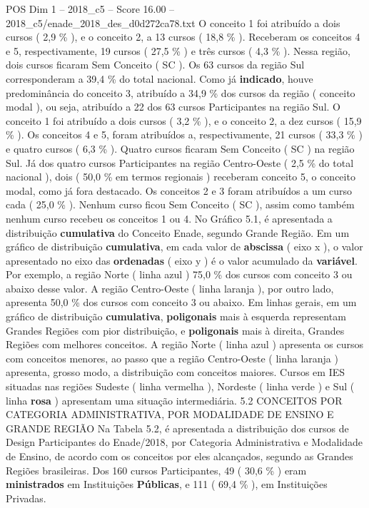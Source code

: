 \begin{textsample}{POS Dim 1 – 2018\_c5 – Score 16.00 – 2018\_c5/enade\_2018\_des\_d0d272ca78.txt}
O conceito 1 foi atribuído a dois cursos ( 2,9 \% ), e o conceito 2, a 13 cursos ( 18,8 \% ).
Receberam os conceitos 4 e 5, respectivamente, 19 cursos ( 27,5 \% ) e três cursos ( 4,3 \% ).
Nessa região, dois cursos ficaram Sem Conceito ( SC ).
Os 63 cursos da região Sul corresponderam a 39,4 \% do total nacional.
Como já \textbf{indicado}, houve predominância do conceito 3, atribuído a 34,9 \% dos cursos da região ( conceito modal ), ou seja, atribuído a 22 dos 63 cursos Participantes na região Sul.
O conceito 1 foi atribuído a dois cursos ( 3,2 \% ), e o conceito 2, a dez cursos ( 15,9 \% ).
Os conceitos 4 e 5, foram atribuídos a, respectivamente, 21 cursos ( 33,3 \% ) e quatro cursos ( 6,3 \% ).
Quatro cursos ficaram Sem Conceito ( SC ) na região Sul.
Já dos quatro cursos Participantes na região Centro-Oeste ( 2,5 \% do total nacional ), dois ( 50,0 \% em termos regionais ) receberam conceito 5, o conceito modal, como já fora destacado.
Os conceitos 2 e 3 foram atribuídos a um curso cada ( 25,0 \% ).
Nenhum curso ficou Sem Conceito ( SC ), assim como também nenhum curso recebeu os conceitos 1 ou 4.
No Gráfico 5.1, é apresentada a distribuição \textbf{cumulativa} do Conceito Enade, segundo Grande Região.
Em um gráfico de distribuição \textbf{cumulativa}, em cada valor de \textbf{abscissa} ( eixo x ), o valor apresentado no eixo das \textbf{ordenadas} ( eixo y ) é o valor acumulado da \textbf{variável}.
Por exemplo, a região Norte ( linha azul ) 75,0 \% dos cursos com conceito 3 ou abaixo desse valor.
A região Centro-Oeste ( linha laranja ), por outro lado, apresenta 50,0 \% dos cursos com conceito 3 ou abaixo.
Em linhas gerais, em um gráfico de distribuição \textbf{cumulativa}, \textbf{poligonais} mais à esquerda representam Grandes Regiões com pior distribuição, e \textbf{poligonais} mais à direita, Grandes Regiões com melhores conceitos.
A região Norte ( linha azul ) apresenta os cursos com conceitos menores, ao passo que a região Centro-Oeste ( linha laranja ) apresenta, grosso modo, a distribuição com conceitos maiores.
Cursos em IES situadas nas regiões Sudeste ( linha vermelha ), Nordeste ( linha verde ) e Sul ( linha \textbf{rosa} ) apresentam uma situação intermediária. 5.2 CONCEITOS POR CATEGORIA ADMINISTRATIVA, POR MODALIDADE DE ENSINO E GRANDE REGIÃO Na Tabela 5.2, é apresentada a distribuição dos cursos de Design Participantes do Enade/2018, por Categoria Administrativa e Modalidade de Ensino, de acordo com os conceitos por eles alcançados, segundo as Grandes Regiões brasileiras.
Dos 160 cursos Participantes, 49 ( 30,6 \% ) eram \textbf{ministrados} em Instituições \textbf{Públicas}, e 111 ( 69,4 \% ), em Instituições Privadas.

\end{textsample}
